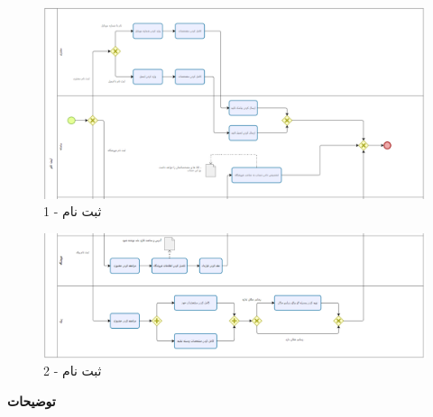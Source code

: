 \documentclass[12pt,a4paper]{article}
\begin{document}
	\begin{figure}[h!]
		\begin{center}
			\includegraphics[width=14cm]{images/Bizagi Register 1.png}	
		\end{center}
		\caption{ثبت نام - 1}
	\end{figure}
	\begin{figure}[h!]
		\begin{center}
			\includegraphics[width=14cm]{images/Bizagi Register 2.png}	
		\end{center}
		\caption{ثبت نام - 2}
	\end{figure}
	
	\textbf{توضیحات}
	
	
	\pagebreak
\end{document}

